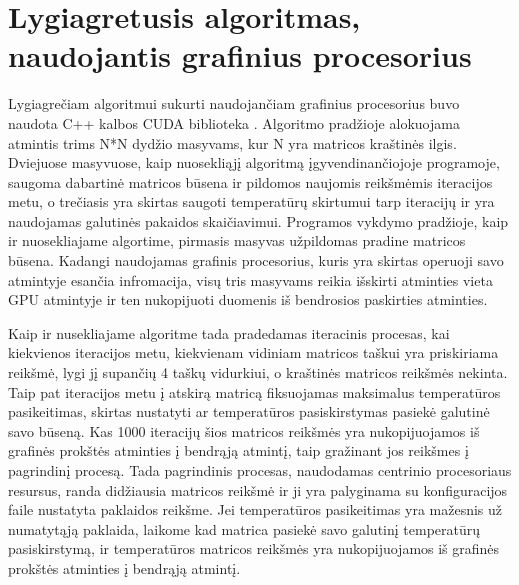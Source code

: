 \documentclass{VUMIFPSbakalaurinis}
\begin{document}


\section{Lygiagretusis algoritmas, naudojantis grafinius procesorius}


Lygiagrečiam algoritmui sukurti naudojančiam grafinius procesorius buvo naudota C++ kalbos CUDA biblioteka \cite{yang2008parallel}. 
Algoritmo pradžioje alokuojama atmintis trims N*N dydžio masyvams, kur N yra matricos kraštinės ilgis. 
Dviejuose masyvuose, kaip nuosekliąjį algoritmą įgyvendinančiojoje programoje, saugoma dabartinė matricos būsena ir pildomos naujomis reikšmėmis iteracijos metu, o trečiasis yra skirtas saugoti temperatūrų skirtumui tarp iteracijų ir yra naudojamas galutinės pakaidos skaičiavimui.
Programos vykdymo pradžioje, kaip ir nuosekliajame algortime, pirmasis masyvas užpildomas pradine matricos būsena.
Kadangi naudojamas grafinis procesorius, kuris yra skirtas operuoji savo atmintyje esančia infromacija, visų tris masyvams reikia išskirti atminties vieta GPU atmintyje ir ten nukopijuoti duomenis iš bendrosios paskirties atminties.

Kaip ir nusekliajame algoritme tada pradedamas iteracinis procesas, kai kiekvienos iteracijos metu, kiekvienam vidiniam matricos taškui yra priskiriama reikšmė, lygi jį supančių 4 taškų vidurkiui, o kraštinės matricos reikšmės nekinta.
Taip pat iteracijos metu į atskirą matricą fiksuojamas maksimalus temperatūros pasikeitimas, skirtas nustatyti ar temperatūros pasiskirstymas pasiekė galutinė savo būseną.
Kas 1000 iteracijų šios matricos reikšmės yra nukopijuojamos iš grafinės prokštės atminties į bendrąją atmintį, taip gražinant jos reikšmes į pagrindinį procesą. 
Tada pagrindinis procesas, naudodamas centrinio procesoriaus resursus, randa didžiausia matricos reikšmė ir ji yra palyginama su konfiguracijos faile nustatyta paklaidos reikšme.
Jei temperatūros pasikeitimas yra mažesnis už numatytąją paklaida, laikome kad matrica pasiekė savo galutinį temperatūrų pasiskirstymą, ir temperatūros matricos reikšmės yra nukopijuojamos iš grafinės prokštės atminties į bendrąją atmintį. 
\end{document}
